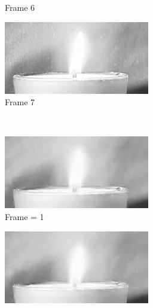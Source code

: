 \documentclass[a4paper, landscape]{article}
\begin{document}
\begin{figure}[H]
\begin{subfigure}{0.13\linewidth}
		\caption{Frame 6}
	\end{subfigure}
	\begin{subfigure}{0.13\linewidth}
		\centering
		\includegraphics[width=\linewidth]{flame/frame = 7.png}
		\caption{Frame 7}
	\end{subfigure}\\
	\begin{subfigure}{0.13\linewidth}
		\centering
		\includegraphics[width=\linewidth]{flame/reconstructed, T = 3, frame = 1.png}
		\caption{Frame = 1}
	\end{subfigure}
	\begin{subfigure}{0.13\linewidth}
		\centering
		\includegraphics[width=\linewidth]{flame/reconstructed, T = 3, frame = 2.png}

\end{subfigure}
\end{figure}
\end{document}
